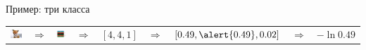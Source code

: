 \documentclass[notes,12pt, aspectratio=169]{beamer}
\newenvironment{wideitemize}{\itemize\addtolength{\itemsep}{10pt}}{\enditemize}
\DeclareMathOperator{\Softmax}{Softmax}
\begin{document}
\begin{frame}{Пример: три класса}
\begin{tabular}{m{2.5cm} m{0.35cm} m{1.8cm} m{0.35cm} m{1cm} m{0.35cm} m{2.7cm} m{0.5cm} m{1.5cm}}
\includegraphics[scale=0.2]{tab_fox.png} & {\Large $\Rightarrow$} & \includegraphics[scale=0.2]{tab_nn.png}  &  {\Large $\Rightarrow$} &  $[4, 4, 1]$ &  {\Large $\Rightarrow$} &  $[0.49, \alert{0.49}, 0.02]$ & {\Large $\Rightarrow$}  & $-\ln 0.49$\\
\end{tabular}
\end{frame}


%
%
%
%
%
\end{document}
